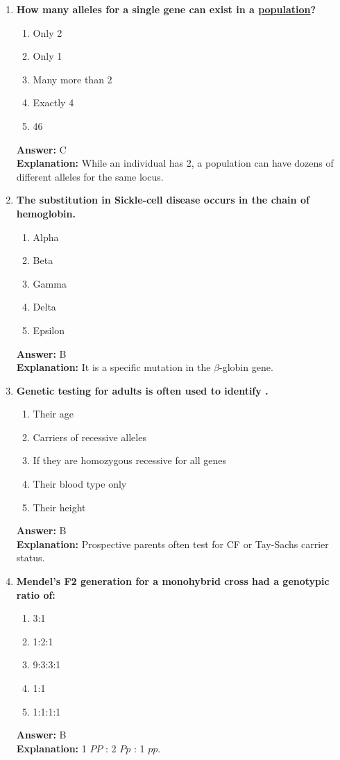 \documentclass[11pt, a4paper]{article}
\begin{document}
\begin{enumerate}[leftmargin=*, label=\arabic*.]
\item \textbf{How many alleles for a single gene can exist in a \underline{population}?}
\begin{enumerate}[label=\Alph*.]
\item Only 2
\item Only 1
\item Many more than 2
\item Exactly 4
\item 46
\end{enumerate}
\textbf{Answer:} C \\
\textbf{Explanation:} While an individual has 2, a population can have dozens of different alleles for the same locus.

\item \textbf{The substitution in Sickle-cell disease occurs in the \underline{\hspace{1cm}} chain of hemoglobin.}
\begin{enumerate}[label=\Alph*.]
\item Alpha
\item Beta
\item Gamma
\item Delta
\item Epsilon
\end{enumerate}
\textbf{Answer:} B \\
\textbf{Explanation:} It is a specific mutation in the $\beta$-globin gene.

\item \textbf{Genetic testing for adults is often used to identify \underline{\hspace{1cm}}.}
\begin{enumerate}[label=\Alph*.]
\item Their age
\item Carriers of recessive alleles
\item If they are homozygous recessive for all genes
\item Their blood type only
\item Their height
\end{enumerate}
\textbf{Answer:} B \\
\textbf{Explanation:} Prospective parents often test for CF or Tay-Sachs carrier status.

\item \textbf{Mendel’s F2 generation for a monohybrid cross had a genotypic ratio of:}
\begin{enumerate}[label=\Alph*.]
\item 3:1
\item 1:2:1
\item 9:3:3:1
\item 1:1
\item 1:1:1:1
\end{enumerate}
\textbf{Answer:} B \\
\textbf{Explanation:} 1 $PP$ : 2 $Pp$ : 1 $pp$.


\end{enumerate}
\end{document}
